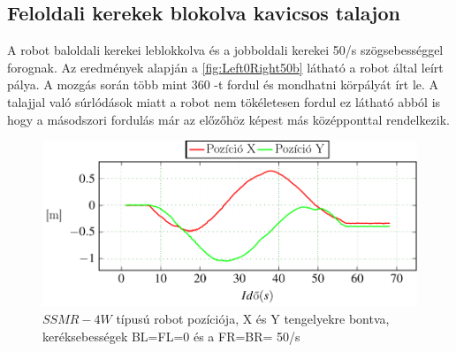 \subsection{Feloldali kerekek blokolva kavicsos talajon}

A robot baloldali kerekei leblokkolva és a jobboldali kerekei 50\degree/s szögsebességgel forognak. Az eredmények alapján a \ref{fig:Left0Right50b} látható a robot által leírt pálya. A mozgás során több mint 360 \degree -t fordul és mondhatni körpályát írt le. A talajjal való súrlódások miatt a robot nem tökéletesen fordul ez látható abból is hogy a másodszori fordulás már az előzőhöz képest más középponttal rendelkezik. 

\renewcommand{\GlobalPath}{Meresek/Mozgasok/HibasMukodes/R_0_L_1/}
\renewcommand{\secondImage}{*}

%

%




\begin{figure}[H]
	\begin{center}
  		\includegraphics[scale=0.8]{tikz/Left0Right50a.pdf}
  	\end{center}
  \caption{$SSMR-4W$ típusú robot pozíciója, X és Y tengelyekre bontva, keréksebességek BL=FL=0 és a FR=BR= 50\degree/s}
    \label{fig:Left0Right50a}
\end{figure}


